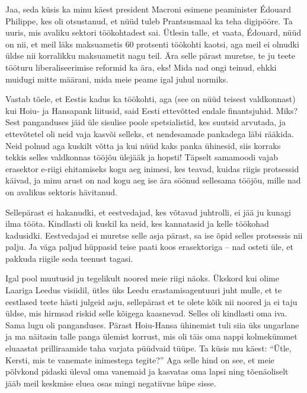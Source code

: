 
Jaa, seda küsis ka minu käest president 
Macroni esimene peaminister Édouard Philippe, kes oli otsustanud, et nüüd tuleb Prantsusmaal ka teha 
digipööre. Ta uuris, mis avaliku sektori
töökohtadest sai. Ütlesin talle, et vaata, Édouard, 
nüüd on nii, et meil läks maksuametis 60 protsenti töökohti kaotsi, aga meil 
ei olnudki üldse nii korralikku maksuametit nagu teil. Ära selle pärast 
muretse, te ju teete tööturu liberaliseerimise reformid ka ära, eks! Mida 
nad ongi teinud, ehkki muidugi mitte määrani, mida meie peame igal 
juhul normiks. 

Vastab tõele, et Eestis kadus ka töökohti, aga (see on nüüd 
teisest valdkonnast) kui Hoiu- ja Hansapank liitusid, said Eesti ettevõtted endale finantsjuhid. Miks? Sest panganduses jäid üle sisulise poole spetsialistid, kes suutsid arvutada, 
ja ettevõtetel oli neid vaja kasvõi 
selleks, et nendesamade pankadega läbi rääkida. Neid polnud aga kuskilt võtta ja kui nüüd
kaks panka ühinesid, siis korraks tekkis selles valdkonnas tööjõu ülejääk 
ja hopsti! Täpselt samamoodi vajab erasektor e-riigi 
ehitamiseks kogu aeg inimesi, kes teavad, kuidas riigis protsessid käivad, ja minu 
arust on nad kogu aeg ise ära söönud sellesama tööjõu, mille nad on avalikus 
sektoris hävitanud.


Sellepärast ei hakanudki, et eestvedajad, kes võtavad 
juhtrolli, ei jää ju kunagi ilma tööta. Kindlasti oli kuskil ka neid, kes 
kannatasid ja kelle töökohad kadusidki. Eestvedajad ei 
muretse selle asja pärast, sa ise õpid selles protsessis nii palju. Ja 
väga paljud hüppasid teise paati koos erasektoriga -- nad osteti üle, et pakkuda riigile seda teenust tagasi.


Igal pool muutusid ju tegelikult noored meie riigi näoks. Ükskord kui olime Laariga Leedus visiidil, ütles üks Leedu erastamisagentuuri juht mulle, et te eestlased teete hästi julgeid asju, sellepärast 
et te olete kõik nii noored ja ei taju üldse, mis hirmsad riskid selle kõigega 
kaasnevad. Selles oli kindlasti oma iva. Sama lugu oli panganduses. Pärast Hoiu-Hansa ühinemist tuli siia üks 
ungarlane ja ma näitasin talle panga
ülemist korrust, mis oli täis oma nappi kolmekümmet eluaastat 
prilliraamide taha varjata püüdvaid tüüpe. Ta küsis mu käest: 
\enquote{Ütle, Kersti, mis te vanemate inimestega tegite?} Aga selle hind on 
see, et meie põlvkond pidaski üleval oma vanemaid ja kasvatas oma lapsi ning
tõenäoliselt jääb meil keskmise eluea osas mingi negatiivne hüpe 
sisse.

